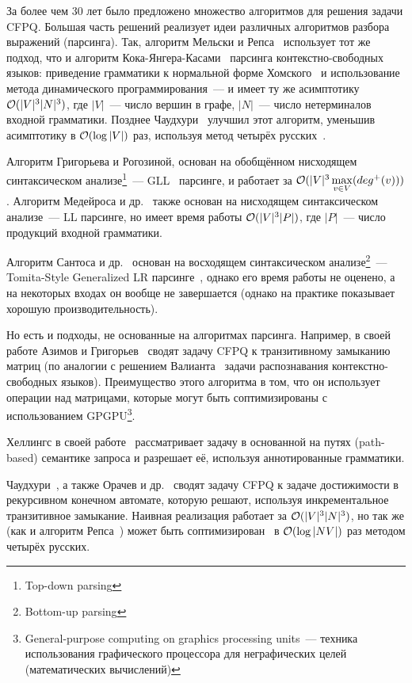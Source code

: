 За более чем 30 лет было предложено множество алгоритмов для решения задачи CFPQ.
Большая часть решений реализует идеи различных алгоритмов разбора выражений (парсинга). Так, алгоритм Мельски и Репса~\cite{Reps97} использует тот же подход, что и алгоритм Кока-Янгера-Касами~\cite{Younger1967} парсинга контекстно-свободных языков: приведение грамматики к нормальной форме Хомского~\cite{Chomsky1957} и использование метода динамического программирования~--- и имеет ту же асимптотику $\mathcal{O}(|V|^3 |N|^3)$, где $|V|$~--- число вершин в графе, $|N|$~--- число нетерминалов входной грамматики. Позднее Чаудхури~\cite{Chaudhuri06} улучшил этот алгоритм, уменьшив асимптотику в $\mathcal{O}(\log |V|)$ раз, используя метод четырёх русских~\cite{Arlazarov70}.

Алгоритм Григорьева и Рогозиной, основан на обобщённом нисходящем синтаксическом анализе\footnote{Top-down parsing}~--- GLL~\cite{Scott10} парсинге, и работает за $\mathcal{O}(|V|^3 \max\limits_{v \in V} (deg^{+}(v)))$. Алгоритм Медейроса и др.~\cite{Medeiros18} также основан на нисходящем синтаксическом анализе~--- LL парсинге, но имеет время работы $\mathcal{O}(|V|^3 |P|)$, где $|P|$~--- число продукций входной грамматики.

Алгоритм Сантоса и др.~\cite{Santos18} основан на восходящем синтаксическом анализе\footnote{Bottom-up parsing}~--- Tomita-Style Generalized LR парсинге~\cite{Scott00}, однако его время работы не оценено, а на некоторых входах он вообще не завершается (однако на практике показывает хорошую производительность). 

Но есть и подходы, не основанные на алгоритмах парсинга. 
Например, в своей работе Азимов и Григорьев~\cite{Santos18} сводят задачу CFPQ к транзитивному замыканию матриц (по аналогии с решением Валианта~\cite{Valiant1975} задачи распознавания контекстно-свободных языков). Преимущество этого алгоритма в том, что он использует операции над матрицами, которые могут быть соптимизированы с использованием GPGPU\footnote{General-purpose computing on graphics processing units~--- техника использования графического процессора для неграфических целей (математических вычислений)}.

Хеллингс в своей работе~\cite{Hellings15} рассматривает задачу в основанной на путях (path-based) семантике запроса и разрешает её, используя аннотированные грамматики.

Чаудхури~\cite{Chaudhuri08}, а также Орачев и др.~\cite{Orachev20} сводят задачу CFPQ к задаче достижимости в рекурсивном конечном автомате, которую решают, используя инкрементальное транзитивное замыкание. Наивная реализация работает за $\mathcal{O}(|V|^3 |N|^3)$, но так же (как и алгоритм Репса~\cite{Reps97,Chaudhuri06}) может быть соптимизирован~\cite{Shemetova21} в $\mathcal{O}(\log |NV|)$ раз методом четырёх русских.

